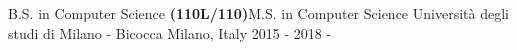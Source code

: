 

\begin{cventries}

  \cventry
    {B.S. in Computer Science \textbf{(110L/110)}\linebreak M.S. in Computer Science} %
    {Università degli studi di Milano - Bicocca} %
    {Milano, Italy} %
    {2015 - 2018  - } %
    {
    }
\vspace{-0.7cm}
\end{cventries}
